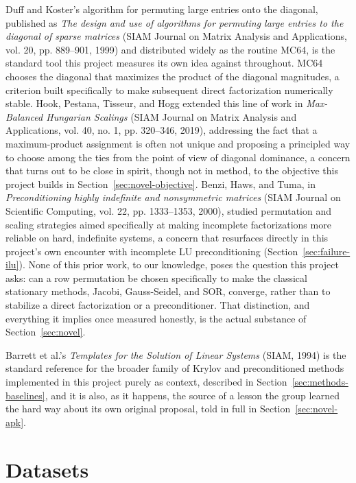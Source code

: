 \documentclass[11pt,a4paper]{article}
\begin{document}
Duff and Koster's algorithm for permuting large entries onto the diagonal, published as
\emph{The design and use of algorithms for permuting large entries to the diagonal of
sparse matrices} (SIAM Journal on Matrix Analysis and Applications, vol. 20, pp. 889--901,
1999) and distributed widely as the routine MC64, is the standard tool this project
measures its own idea against throughout. MC64 chooses the diagonal that maximizes the
product of the diagonal magnitudes, a criterion built specifically to make subsequent
direct factorization numerically stable. Hook, Pestana, Tisseur, and Hogg extended this
line of work in \emph{Max-Balanced Hungarian Scalings} (SIAM Journal on Matrix Analysis
and Applications, vol. 40, no. 1, pp. 320--346, 2019), addressing the fact that a
maximum-product assignment is often not unique and proposing a principled way to choose
among the ties from the point of view of diagonal dominance, a concern that turns out to
be close in spirit, though not in method, to the objective this project builds in
Section~\ref{sec:novel-objective}. Benzi, Haws, and Tuma, in \emph{Preconditioning highly
indefinite and nonsymmetric matrices} (SIAM Journal on Scientific Computing, vol. 22, pp.
1333--1353, 2000), studied permutation and scaling strategies aimed specifically at
making incomplete factorizations more reliable on hard, indefinite systems, a concern that
resurfaces directly in this project's own encounter with incomplete LU preconditioning
(Section~\ref{sec:failure-ilu}). None of this prior work, to our knowledge, poses the
question this project asks: can a row permutation be chosen specifically to make the
classical stationary methods, Jacobi, Gauss-Seidel, and SOR, converge, rather than to
stabilize a direct factorization or a preconditioner. That distinction, and everything it
implies once measured honestly, is the actual substance of Section~\ref{sec:novel}.

Barrett et al.'s \emph{Templates for the Solution of Linear Systems} (SIAM, 1994) is the
standard reference for the broader family of Krylov and preconditioned methods
implemented in this project purely as context, described in
Section~\ref{sec:methods-baselines}, and it is also, as it happens, the source of a
lesson the group learned the hard way about its own original proposal, told in full in
Section~\ref{sec:novel-apk}.

\clearpage
\section{Datasets}
\label{sec:datasets}
\end{document}
